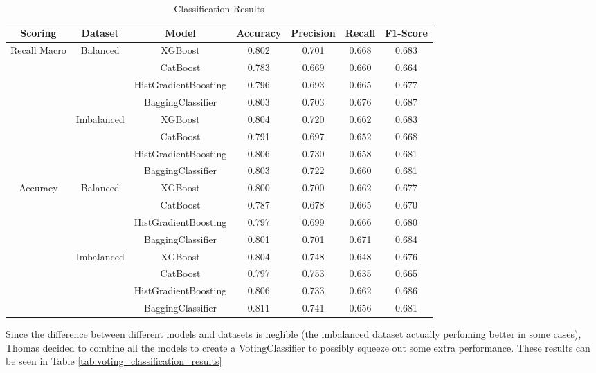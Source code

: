 \documentclass[conference]{IEEEtran}
\begin{document}
\begin{table}[t]
  \centering
  \caption{Classification Results}
  \label{tab:classification_results}
  \begin{tabular}{|c|c|c|c|c|c|c|}
    \hline
    \textbf{Scoring} & \textbf{Dataset} & \textbf{Model} & \textbf{Accuracy} & \textbf{Precision} & \textbf{Recall} & \textbf{F1-Score} \\
    \hline
    \multirow{2}{*}{Recall Macro} & \multirow{4}{*}{Balanced} & XGBoost & 0.802 & 0.701 & 0.668 & 0.683 \\
    & & CatBoost & 0.783 & 0.669 & 0.660 & 0.664 \\
    & & HistGradientBoosting & 0.796 & 0.693 & 0.665 & 0.677 \\
    & & BaggingClassifier & 0.803 & 0.703 & 0.676 & 0.687 \\
    \cline{2-7}
    & \multirow{4}{*}{Imbalanced} & XGBoost & 0.804 & 0.720 & 0.662 & 0.683 \\
    & & CatBoost & 0.791 & 0.697 & 0.652 & 0.668 \\
    & & HistGradientBoosting & 0.806 & 0.730 & 0.658 & 0.681 \\
    & & BaggingClassifier & 0.803 & 0.722 & 0.660 & 0.681 \\
    \hline
    \multirow{2}{*}{Accuracy} & \multirow{4}{*}{Balanced} & XGBoost & 0.800 & 0.700 & 0.662 &  0.677 \\
    & & CatBoost & 0.787 & 0.678 & 0.665 & 0.670 \\
    & & HistGradientBoosting & 0.797 & 0.699 & 0.666 & 0.680 \\
    & & BaggingClassifier & 0.801 & 0.701 & 0.671 & 0.684 \\
    \cline{2-7}
    & \multirow{4}{*}{Imbalanced} & XGBoost & 0.804 & 0.748 & 0.648 & 0.676 \\
    & & CatBoost & 0.797 & 0.753 & 0.635 & 0.665\\
    & & HistGradientBoosting & 0.806 & 0.733 & 0.662 & 0.686 \\
    & & BaggingClassifier & 0.811 & 0.741 & 0.656 & 0.681 \\
    \hline
  \end{tabular}
\end{table}

Since the difference between different models and datasets is neglible (the imbalanced dataset actually perfoming better in some cases), Thomas decided to combine all the models to create a VotingClassifier to possibly squeeze out some extra performance. These results can be seen in Table \ref{tab:voting_classification_results}
\end{document}
